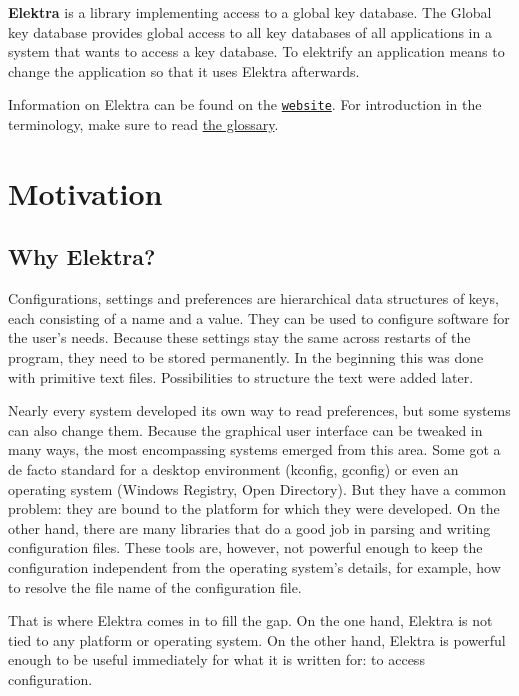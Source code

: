 {\bfseries Elektra} is a library implementing access to a global key database. The Global key database provides global access to all key databases of all applications in a system that wants to access a key database. To elektrify an application means to change the application so that it uses Elektra afterwards.

Information on Elektra can be found on the \href{http://www.libelektra.org}{\tt website}. For introduction in the terminology, make sure to read \hyperlink{md_doc_help_elektra-glossary_doc_help_elektra-glossary_md}{the glossary}.\hypertarget{md_doc_help_elektra-introduction_doc_help_elektra-introduction_md}{}\section{Motivation}\label{md_doc_help_elektra-introduction_doc_help_elektra-introduction_md}
\subsection*{Why Elektra?}

Configurations, settings and preferences are hierarchical data structures of keys, each consisting of a name and a value. They can be used to configure software for the user's needs. Because these settings stay the same across restarts of the program, they need to be stored permanently. In the beginning this was done with primitive text files. Possibilities to structure the text were added later.

Nearly every system developed its own way to read preferences, but some systems can also change them. Because the graphical user interface can be tweaked in many ways, the most encompassing systems emerged from this area. Some got a de facto standard for a desktop environment (kconfig, gconfig) or even an operating system (Windows Registry, Open Directory). But they have a common problem\+: they are bound to the platform for which they were developed. On the other hand, there are many libraries that do a good job in parsing and writing configuration files. These tools are, however, not powerful enough to keep the configuration independent from the operating system's details, for example, how to resolve the file name of the configuration file.

That is where Elektra comes in to fill the gap. On the one hand, Elektra is not tied to any platform or operating system. On the other hand, Elektra is powerful enough to be useful immediately for what it is written for\+: to access configuration.

